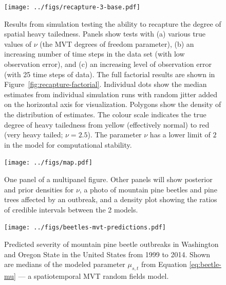 \documentclass[12pt,english]{article}
\begin{document}
\begin{spacing}{1.25}
\begin{figure}[htb]
\begin{center}
  \texttt{[image: ../figs/recapture-3-base.pdf]}
\caption{Results from simulation testing the ability to recapture the degree
of spatial heavy tailedness. Panels show
tests with (a) various true values of $\nu$ (the MVT degrees of freedom parameter),
(b) an increasing number of time steps in the data set (with low observation error),
and (c) an increasing level of observation error (with 25 time steps of data).
The full factorial results are shown in Figure~\ref{fig:recapture-factorial}.
Individual dots show the median estimates from individual simulation runs
with random jitter added on the horizontal axis for visualization.
Polygons show the density of the distribution of estimates.
The colour scale indicates the true degree of heavy tailedness from
yellow (effectively normal) to red (very heavy tailed; $\nu = 2.5$).
The parameter $\nu$ has a lower limit of $2$ in the model
for computational stability.
}
\label{fig:recapture}
\end{center}
\end{figure}

\begin{figure}[htb]
\begin{center}
  \texttt{[image: ../figs/map.pdf]}
\caption{One panel of a multipanel figure.
  Other panels will show posterior and prior densities for $\nu$,
  a photo of mountain pine beetles and pine trees affected by an outbreak,
  and a density plot showing the ratios of credible intervals between the 2 models.
}
\label{fig:map-etc}
\end{center}
\end{figure}

\clearpage

\begin{figure}[htb]
\begin{center}
  \texttt{[image: ../figs/beetles-mvt-predictions.pdf]}
\caption{Predicted severity of mountain pine beetle outbreaks in Washington and
  Oregon State in the United States from 1999 to 2014.
  Shown are medians of the modeled parameter $\mu_{s,t}$ from Equation \ref{eq:beetle-mu}
  --- a spatiotemporal MVT random fields model.
}
\label{fig:beetle-pred}
\end{center}
\end{figure}

\clearpage



\end{spacing}
\end{document}
